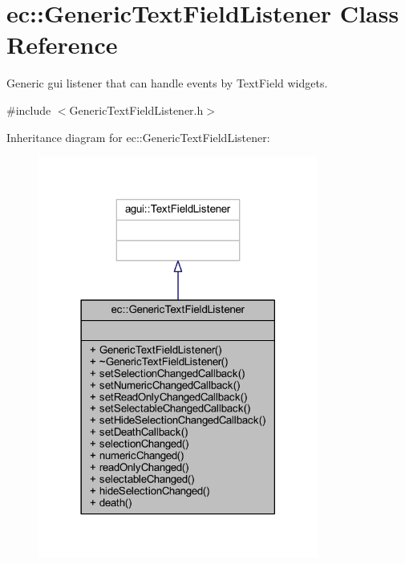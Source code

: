 \hypertarget{classec_1_1_generic_text_field_listener}{}\section{ec\+:\+:Generic\+Text\+Field\+Listener Class Reference}
\label{classec_1_1_generic_text_field_listener}


Generic gui listener that can handle events by Text\+Field widgets.  




{\ttfamily \#include $<$Generic\+Text\+Field\+Listener.\+h$>$}



Inheritance diagram for ec\+:\+:Generic\+Text\+Field\+Listener\+:\nopagebreak
\begin{figure}[H]
\begin{center}
\leavevmode
\includegraphics[width=261pt]{classec_1_1_generic_text_field_listener__inherit__graph}
\end{center}
\end{figure}


